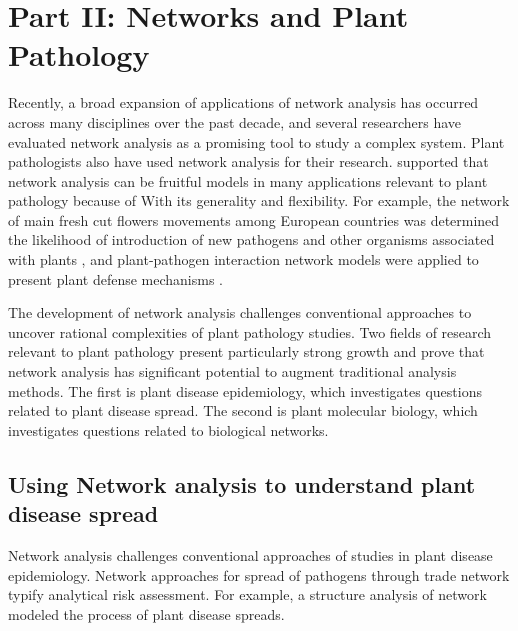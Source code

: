 \section*{Part II: Networks and Plant Pathology}

Recently, a broad expansion of applications of network analysis has occurred across many disciplines over the past decade, and several researchers have evaluated network analysis as a promising tool to study a complex system. Plant pathologists also have used network analysis for their research.  supported that network analysis can be fruitful models in many applications relevant to plant pathology because of With its generality and flexibility. For example, the network of main fresh cut flowers movements among European countries was determined the likelihood of introduction of new pathogens and other organisms associated with plants , and plant-pathogen interaction network models were applied to present plant defense mechanisms .

The development of network analysis challenges conventional approaches to uncover rational complexities of plant pathology studies. Two fields of research relevant to plant pathology present particularly strong growth and prove that network analysis has significant potential to augment traditional analysis methods. The first is plant disease epidemiology, which investigates questions related to plant disease spread. The second is plant molecular biology, which investigates questions related to biological networks.


\subsection*{Using Network analysis to understand plant disease spread}

Network analysis challenges conventional approaches of studies in plant disease epidemiology. Network approaches for spread of pathogens through trade network typify analytical risk assessment.
For example, a structure analysis of network modeled the process of plant disease spreads.

